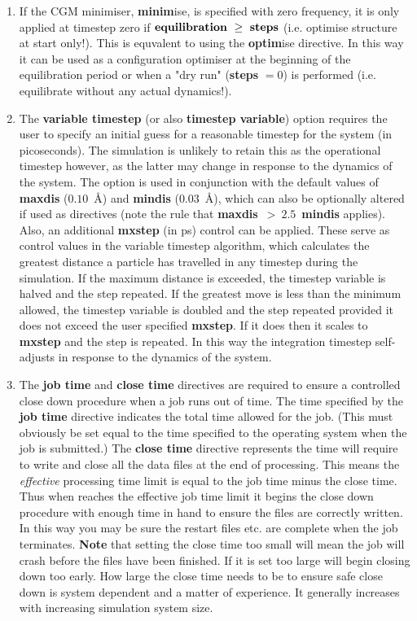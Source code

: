 \begin{enumerate}
\item If the CGM minimiser, {\bf minim}ise, is specified with zero
frequency, it is only applied at timestep zero if
${\bf equilibration}~\ge~{\bf steps}$ (i.e. optimise structure at
start only!).  This is equvalent to using the {\bf optim}ise
directive.  In this way it can be used as a configuration
optimiser at the beginning of the equilibration period or when
a "dry run" ({\bf steps} $= 0$) is performed (i.e. equilibrate
without any actual dynamics!).

\item The {\bf variable timestep} (or also {\bf timestep variable})
option requires the user to specify an initial guess for a
reasonable timestep for the system (in picoseconds).  The simulation
is unlikely to retain this as the operational timestep however, as
the latter may change in response to the dynamics of the system.  The
option is used in conjunction with the default values of {\bf maxdis}
($0.10$~\AA) and {\bf mindis} ($0.03$~\AA), which can also be
optionally altered if used as directives (note the rule that
{\bf maxdis}~$>~2.5$~{\bf mindis} applies).  Also, an additional
{\bf mxstep} (in ps) control can be applied.  These serve as
control values in the variable timestep algorithm, which calculates
the greatest distance a particle has travelled in any timestep
during the simulation.  If the maximum distance is exceeded, the
timestep variable is halved and the step repeated.  If the greatest
move is less than the minimum allowed, the timestep variable is
doubled and the step repeated provided it does not exceed the
user specified {\bf mxstep}.  If it does then it scales to
{\bf mxstep} and the step is repeated.  In this way the integration
timestep self-adjusts in response to the dynamics of the system.

\item The {\bf job time} and {\bf close time} directives are
required to ensure a controlled close down procedure when a job
runs out of time.  The time specified by the {\bf job time}
directive indicates the total time allowed for the job.  (This
must obviously be set equal to the time specified to the operating
system when the job is submitted.)  The {\bf close time} directive
represents the time \D will require to write and close all the
data files at the end of processing.  This means the {\em
effective} processing time limit is equal to the job time minus
the close time.  Thus when \D reaches the effective job time limit
it begins the close down procedure with enough time in hand to
ensure the files are correctly written.  In this way you may be
sure the restart files etc. are complete when the job terminates.
{\bf Note} that setting the close time too small will mean the job
will crash before the files have been finished.  If it is set too
large \D will begin closing down too early.  How large the close
time needs to be to ensure safe close down is system dependent and
a matter of experience.  It generally increases with increasing
simulation system size.


\end{enumerate}
